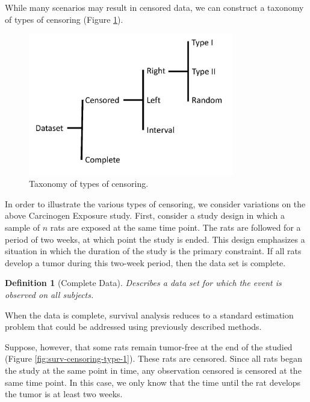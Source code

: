 \documentclass[
]{book}
\theoremstyle{plain}
\theoremstyle{mydefn}
\newtheorem{definition}{Definition}[chapter]
\theoremstyle{myexmpl}
\theoremstyle{remark}
\begin{document}
While many scenarios may result in censored data, we can construct a taxonomy of types of censoring (Figure \ref{fig:surv-taxonomy}).

\begin{figure}

{\centering \includegraphics[width=0.8\textwidth]{images/censoring-taxonomy} 

}

\caption{Taxonomy of types of censoring.}\label{fig:surv-taxonomy}
\end{figure}

In order to illustrate the various types of censoring, we consider variations on the above Carcinogen Exposure study. First, consider a study design in which a sample of \(n\) rats are exposed at the same time point. The rats are followed for a period of two weeks, at which point the study is ended. This design emphasizes a situation in which the duration of the study is the primary constraint. If all rats develop a tumor during this two-week period, then the data set is complete.

\begin{definition}[Complete Data]
\protect\hypertarget{def:defn-complete}{}{\label{def:defn-complete} {} }Describes a data set for which the event is observed on all subjects.
\end{definition}

When the data is complete, survival analysis reduces to a standard estimation problem that could be addressed using previously described methods.

Suppose, however, that some rats remain tumor-free at the end of the studied (Figure \ref{fig:surv-censoring-type-1}). These rats are censored. Since all rats began the study at the same point in time, any observation censored is censored at the same time point. In this case, we only know that the time until the rat develops the tumor is at least two weeks.
\end{document}
